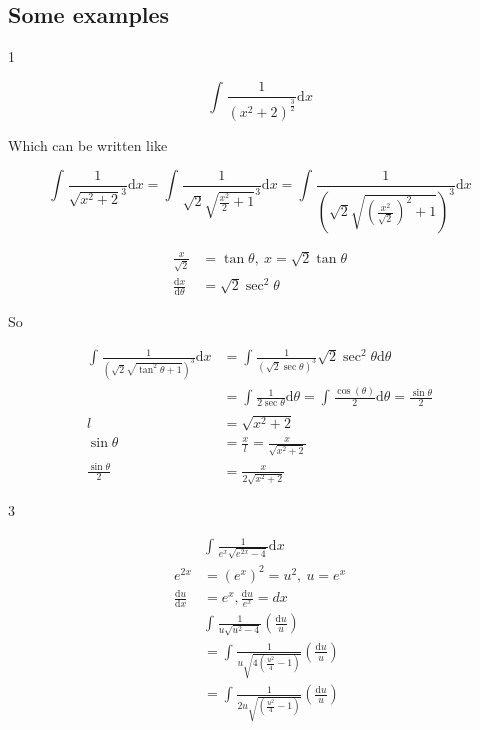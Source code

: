 \documentclass[12pt]{article}
\theoremstyle{plain}
\theoremstyle{remark}
\theoremstyle{definition}
\begin{document}
\subsection{Some examples}

1

\[\int_{}^{}{\frac{1}{\left( x^{2} + 2 \right)^{\frac{3}{2}}}\text{d}x}\]

Which can be written like

\[{\int_{}^{}{\frac{1}{{\sqrt{x^{2} + 2}}^{3}}\text{d}x} }{= \int_{}^{}{\frac{1}{{\sqrt{2}\sqrt{\frac{x^{2}}{2} + 1}}^{3}}\text{d}x} }{= \int_{}^{}{\frac{1}{\left( \sqrt{2}\sqrt{\left( \frac{x^{2}}{\sqrt{2}} \right)^{2} + 1} \right)^{3}}\text{d}x}} \]

\begin{align*}
\frac{x}{\sqrt{2}} &= \tan\theta,\ x = \sqrt{2}\tan\theta \\
\frac{\text{d}x}{\text{d}\theta} &= \sqrt{2}\sec^{2}\theta
\end{align*}


So

\begin{align*}
\int_{}^{}{\frac{1}{\left( \sqrt{2}\sqrt{\tan^{2}\theta + 1} \right)^{3}}\text{d}x} &= \int_{}^{}{\frac{1}{\left( \sqrt{2}\sec\theta \right)^{3}}\sqrt{2}\sec^{2}\theta\text{d}\theta} \\
&= \int_{}^{}{\frac{1}{2\sec\theta}\text{d}\theta} = \int_{}^{}{\frac{\cos(\theta)}{2}\text{d}\theta} = \frac{\sin\theta}{2} \\
l &= \sqrt{x^{2} + 2}
 \\
\sin\theta &= \frac{x}{l} = \frac{x}{\sqrt{x^{2} + 2}} \\
\frac{\sin\theta}{2} &= \frac{x}{2\sqrt{x^{2} + 2}}
\end{align*}



3

\begin{align*}
&\int_{}^{}{\frac{1}{e^{x}\sqrt{e^{2x} - 4}}\text{d}x} \\
e^{2x} &= \left( e^{x} \right)^{2} = u^{2},\ u = e^{x} \\
\frac{\text{d}u}{\text{d}x} &= e^{x},\frac{\text{d}u}{e^{x}} = dx
 \\
&\int_{}^{}{\frac{1}{u\sqrt{u^{2} - 4}}\left( \frac{\text{d}u}{u} \right)} \\
&= \int_{}^{}{\frac{1}{u\sqrt{4\left( \frac{u^{2}}{4} - 1 \right)}}\left( \frac{\text{d}u}{u} \right)} \\
&= \int_{}^{}{\frac{1}{2u\sqrt{\left( \frac{u^{2}}{4} - 1 \right)}}\left( \frac{\text{d}u}{u} \right)}
\end{align*}
\end{document}
